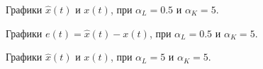 \begin{figure}[!h]
\caption{Графики $\hat{x}(t)$ и $x(t)$, при $\alpha_L = 0.5$ и $\alpha_K = 5$.}
\label{4_6_0.55x}
\end{figure}

\begin{figure}[!h]
\caption{Графики $e(t) = \hat{x}(t)-x(t)$, при $\alpha_L = 0.5$ и $\alpha_K = 5$.}
\label{4_6_0.55e}
\end{figure}


\begin{figure}[!h]
\caption{Графики $\hat{x}(t)$ и $x(t)$, при $\alpha_L = 5$ и $\alpha_K = 5$.}
\label{4_6_55x}
\end{figure}

